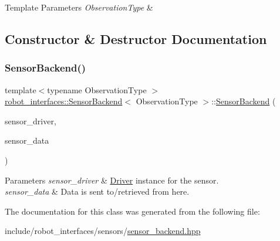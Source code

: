 \begin{DoxyTemplParams}{Template Parameters}
{\em Observation\+Type} & \\
\hline
\end{DoxyTemplParams}


\subsection{Constructor \& Destructor Documentation}
\mbox{\label{classrobot__interfaces_1_1SensorBackend_af24fda0e1d54274cf8122195f82acea9}} 
\subsubsection{\texorpdfstring{Sensor\+Backend()}{SensorBackend()}}
{\footnotesize\ttfamily template$<$typename Observation\+Type $>$ \\
\hyperlink{classrobot__interfaces_1_1SensorBackend}{robot\+\_\+interfaces\+::\+Sensor\+Backend}$<$ Observation\+Type $>$\+::\hyperlink{classrobot__interfaces_1_1SensorBackend}{Sensor\+Backend} (\begin{DoxyParamCaption}\item[{std\+::shared\+\_\+ptr$<$ \hyperlink{classrobot__interfaces_1_1SensorDriver}{Sensor\+Driver}$<$ Observation\+Type $>$$>$}]{sensor\+\_\+driver,  }\item[{std\+::shared\+\_\+ptr$<$ \hyperlink{classrobot__interfaces_1_1SensorData}{Sensor\+Data}$<$ Observation\+Type $>$$>$}]{sensor\+\_\+data }\end{DoxyParamCaption})\hspace{0.3cm}{\ttfamily [inline]}}


\begin{DoxyParams}{Parameters}
{\em sensor\+\_\+driver} & \hyperlink{classDriver}{Driver} instance for the sensor. \\
\hline
{\em sensor\+\_\+data} & Data is sent to/retrieved from here. \\
\hline
\end{DoxyParams}


The documentation for this class was generated from the following file\+:\begin{DoxyCompactItemize}
\item 
include/robot\+\_\+interfaces/sensors/\hyperlink{sensor__backend_8hpp}{sensor\+\_\+backend.\+hpp}\end{DoxyCompactItemize}
